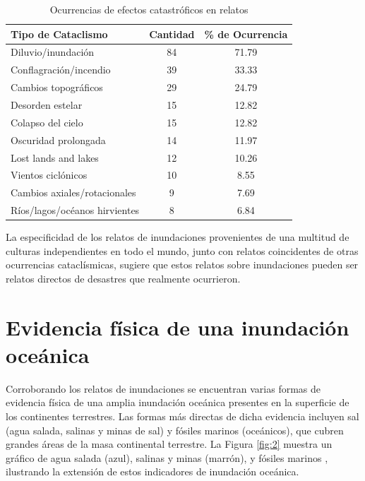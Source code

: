 \documentclass[10pt,twocolumn,letterpaper]{article}
\begin{document}
\begin{table}[ht]
\begin{center}
\renewcommand{\arraystretch}{1.2}  %
\begin{tabular}{|l|c|c|}
\hline
\textbf{Tipo de Cataclismo} & \textbf{Cantidad} & \textbf{\% de Ocurrencia} \\
\hline\hline
Diluvio/inundación            & 84 & 71.79 \\
Conflagración/incendio        & 39 & 33.33 \\
Cambios topográficos          & 29 & 24.79 \\
Desorden estelar              & 15 & 12.82 \\
Colapso del cielo             & 15 & 12.82 \\
Oscuridad prolongada          & 14 & 11.97 \\

Lost lands and lakes    & 12 & 10.26 \\
Vientos ciclónicos          & 10 & 8.55  \\
Cambios axiales/rotacionales & 9 & 7.69  \\
Ríos/lagos/océanos hirvientes & 8 & 6.84 \\
\hline
\end{tabular}
\end{center}
\caption{Ocurrencias de efectos catastróficos en relatos}
\label{tab: 1}
\end{table}

La especificidad de los relatos de inundaciones provenientes de una multitud de culturas independientes en todo el mundo, junto con relatos coincidentes de otras ocurrencias cataclísmicas, sugiere que estos relatos sobre inundaciones pueden ser relatos directos de desastres que realmente ocurrieron.

\section{Evidencia física de una inundación oceánica}

Corroborando los relatos de inundaciones se encuentran varias formas de evidencia física de una amplia inundación oceánica presentes en la superficie de los continentes terrestres. Las formas más directas de dicha evidencia incluyen sal (agua salada, salinas y minas de sal) y fósiles marinos (oceánicos), que cubren grandes áreas de la masa continental terrestre. La Figura \ref{fig:2} muestra un gráfico de agua salada (azul), salinas y minas (marrón), y fósiles marinos \cite{15,16,86,87}, ilustrando la extensión de estos indicadores de inundación oceánica.
\end{document}
